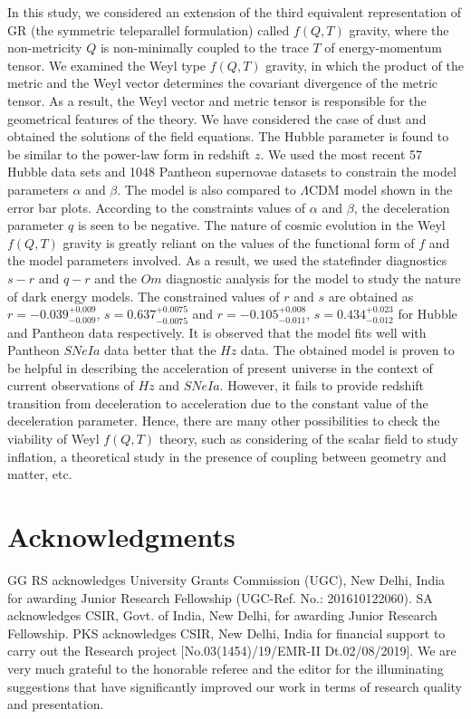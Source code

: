 In this study, we considered an extension of the third equivalent representation of GR (the symmetric teleparallel formulation) called $f(Q, T)$ gravity, where the non-metricity $Q$ is non-minimally coupled to the trace $T$ of energy-momentum tensor. We examined the Weyl type $f(Q, T)$ gravity, in which the product of the metric and the Weyl vector determines the covariant divergence of the metric tensor. As a result, the Weyl vector and metric tensor is responsible for the geometrical features of the theory. We have considered the case of dust and obtained the solutions  of the field equations. The Hubble parameter is found to be similar to the power-law form in redshift $z$. 
We used the most recent 57 Hubble data sets and 1048 Pantheon supernovae datasets to constrain the model parameters $\alpha$ and $\beta$. The model is also compared to $\Lambda$CDM model shown in the error bar plots. According to the constraints values of $\alpha$ and $\beta$, the deceleration parameter $q$ is seen to be negative. The nature of cosmic evolution in the Weyl $f(Q, T)$ gravity is greatly reliant on the values of the functional form of $f$ and the model parameters involved. As a result, we used the statefinder diagnostics $s-r$ and $q-r$ and the $Om$ diagnostic analysis for the model to study the nature of dark energy models. The constrained values of $r$ and $s$ are obtained as $r= -0.039^{+0.009}_{-0.009}$, $s= 0.637^{+0.0075}_{-0.0075}$ and $r= -0.105^{+0.008}_{-0.011}$, $s= 0.434^{+0.023}_{-0.012}$ for Hubble and Pantheon data respectively. It is observed that the model fits well with Pantheon $SNe Ia$ data better that the $Hz$ data. The obtained model is proven to be helpful in describing the acceleration of present universe in the context of current observations of $Hz$ and $SNe Ia$. However, it fails to provide redshift transition from deceleration to acceleration due to the constant value of the deceleration parameter. Hence, there are many other possibilities to check the viability of Weyl $f(Q, T)$ theory, such as considering of the scalar field to study inflation, a theoretical study in the presence of coupling between geometry and matter, etc.

\section*{Acknowledgments}

GG RS acknowledges University Grants Commission (UGC), New Delhi, India for awarding Junior Research Fellowship (UGC-Ref. No.: 201610122060). SA acknowledges CSIR, Govt. of India, New Delhi, for awarding Junior Research Fellowship. PKS acknowledges CSIR, New Delhi, India for financial support to carry out the Research project [No.03(1454)/19/EMR-II Dt.02/08/2019]. We are very much grateful to the honorable referee and the editor for the illuminating suggestions that have significantly improved our work in terms of research quality and presentation.


